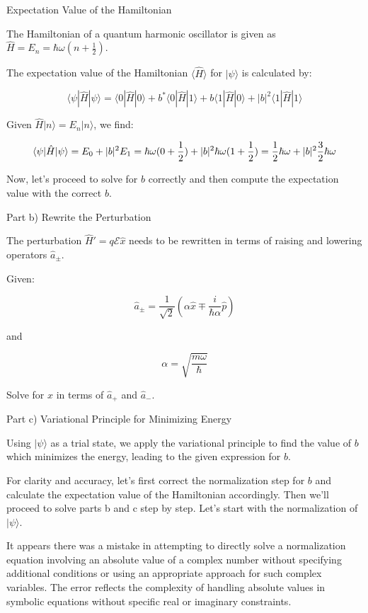 \documentclass[a4paper,11pt]{article}
\begin{document}
Expectation Value of the Hamiltonian

The Hamiltonian of a quantum harmonic oscillator is given as \( \hat{H} = E_n = \hbar\omega(n+\frac{1}{2}) \).

The expectation value of the Hamiltonian \( \langle \hat{H} \rangle \) for \( | \psi \rangle \) is calculated by:

\[
\langle \psi | \hat{H} | \psi \rangle = \langle 0 | \hat{H} | 0 \rangle + b^* \langle 0 | \hat{H} | 1 \rangle + b \langle 1 | \hat{H} | 0 \rangle + |b|^2 \langle 1 | \hat{H} | 1 \rangle
\]

Given \( \hat{H} | n \rangle = E_n | n \rangle \), we find:

\[
\langle \psi | \hat{H} | \psi \rangle = E_0 + |b|^2 E_1 \\
= \hbar\omega(0+\frac{1}{2}) + |b|^2 \hbar\omega(1+\frac{1}{2}) \\
= \frac{1}{2}\hbar\omega + |b|^2 \frac{3}{2}\hbar\omega
\]

Now, let's proceed to solve for \( b \) correctly and then compute the expectation value with the correct \( b \).

Part b) Rewrite the Perturbation

The perturbation \( \hat{H}' = q \mathcal{E} \hat{x} \) needs to be rewritten in terms of raising and lowering operators \( \hat{a}_{\pm} \).

Given:

\[
\hat{a}_{\pm} = \frac{1}{\sqrt{2}}(\alpha \hat{x} \mp \frac{i}{\hbar\alpha} \hat{p})
\]

and

\[
\alpha = \sqrt{\frac{m\omega}{\hbar}}
\]

Solve for \( \hat{x} \) in terms of \( \hat{a}_{+} \) and \( \hat{a}_{-} \).

Part c) Variational Principle for Minimizing Energy

Using \( | \psi \rangle \) as a trial state, we apply the variational principle to find the value of \( b \) which minimizes the energy, leading to the given expression for \( b \).

For clarity and accuracy, let's first correct the normalization step for \( b \) and calculate the expectation value of the Hamiltonian accordingly. Then we'll proceed to solve parts b and c step by step. Let's start with the normalization of \( | \psi \rangle \).

It appears there was a mistake in attempting to directly solve a normalization equation involving an absolute value of a complex number without specifying additional conditions or using an appropriate approach for such complex variables. The error reflects the complexity of handling absolute values in symbolic equations without specific real or imaginary constraints.
\end{document}
